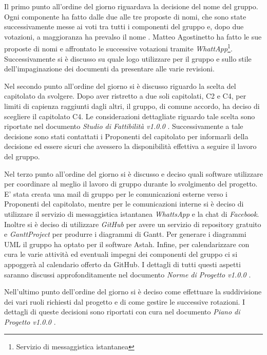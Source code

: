 Il primo punto all'ordine del giorno riguardava la decisione del nome del gruppo. Ogni componente ha fatto dalle due alle tre proposte di nomi, che sono state successivamente messe ai voti tra tutti i componenti del gruppo e, dopo due votazioni, a maggioranza ha prevalso il nome \GRUPPO. Matteo Agostinetto ha fatto le sue proposte di nomi e affrontato le successive votazioni tramite \textit{WhattApp}\footnote{Servizio di messaggistica istantanea}. Successivamente si è discusso su quale logo utilizzare per il gruppo e sullo stile dell'impaginazione dei documenti da presentare alle varie revisioni.

\noindent Nel secondo punto all'ordine del giorno si è discusso riguardo la scelta del capitolato da svolgere. Dopo aver ristretto a due soli capitolati, C2 e C4, per limiti di capienza raggiunti dagli altri, il gruppo, di comune accordo, ha deciso di scegliere il capitolato C4. Le considerazioni dettagliate riguardo tale scelta sono riportate nel documento \textit{Studio di Fattibilità v1.0.0} . Successivamente a tale decisione sono stati contattati i Proponenti del capitolato per informarli della decisione ed essere sicuri che avessero la disponibilità effettiva a seguire il lavoro del gruppo.

\noindent Nel terzo punto all'ordine del giorno si è discusso e deciso quali software utilizzare per coordinare al meglio il lavoro di gruppo durante lo svolgimento del progetto. E' stata creata una mail di gruppo per le comunicazioni esterne verso i Proponenti del capitolato, mentre per le comunicazioni interne si è deciso di utilizzare il servizio di messaggistica istantanea \textit{WhattsApp} e la chat di \textit{Facebook}. Inoltre si è deciso di utilizzare \textit{GitHub} per avere un servizio di repository gratuito e \textit{GanttProject} per produrre i diagrammi di Gantt. Per generare i diagrammi UML il gruppo ha optato per il software Astah. Infine, per calendarizzare con cura le varie attività ed eventuali impegni dei componenti del gruppo ci si appoggerà al calendario offerto da GitHub. I dettagli di
tutti questi aspetti saranno discussi approfonditamente nel documento \textit{Norme di Progetto v1.0.0} .

\noindent Nell'ultimo punto dell'ordine del giorno si è deciso come effettuare la suddivisione dei vari ruoli richiesti dal progetto e di come gestire le successive rotazioni. I dettagli di queste decisioni sono riportati con cura nel documento \textit{Piano di Progetto v1.0.0} .